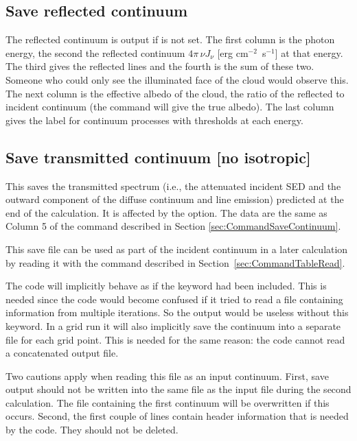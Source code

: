 \subsection{Save reflected continuum}

The reflected continuum is output if  is not set.  The first column
is the photon energy, the second the reflected continuum $4\pi \,\nu J_\nu
$ [erg  cm$^{-2}$~s$^{-1}$] at that energy.  The third gives the reflected lines
and the fourth is the sum of these two.  Someone who could only see the
illuminated face of the cloud would observe this.  The next column is the
effective albedo of the cloud, the ratio of the reflected to incident
continuum (the  command will give the
true albedo).  The last column gives the label
for continuum processes with thresholds at each energy.

\subsection{Save transmitted continuum [no isotropic]}
\label{sec:CommandSaveTransmittedContinuum}

This saves the transmitted spectrum (i.e., the attenuated incident SED and the outward component
of the diffuse continuum and line emission) predicted at the end of the calculation.
It is affected by the  option.
The data are the same as Column 5 of the 
command described in Section \ref{sec:CommandSaveContinuum}.

This save file can be used as part of the incident continuum in a later
calculation by reading it with the  command described in
Section~\ref{sec:CommandTableRead}.

The code will implicitly behave as if the keyword  had been
included. This is needed since the code would become confused if it tried to
read a file containing information from multiple iterations. So the output
would be useless without this keyword. In a grid run it will also implicitly
save the continuum into a separate file for each grid point. This is needed
for the same reason: the code cannot read a concatenated output file.

Two cautions apply when reading this file as an input continuum. First, save
output should not be written into the same file as the input file during the
second calculation. The file containing the first continuum will be
overwritten if this occurs. Second, the first couple of lines contain header
information that is needed by the code. They should not be deleted.

